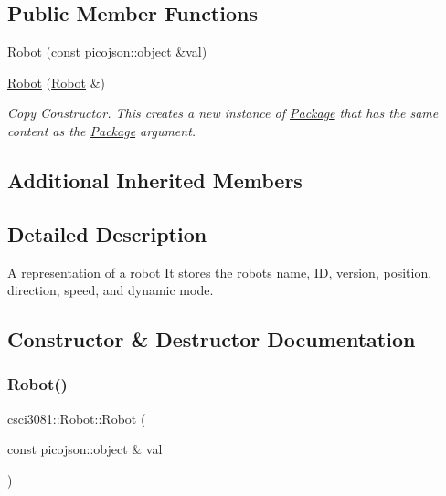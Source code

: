 \subsection*{Public Member Functions}
\begin{DoxyCompactItemize}
\item 
\hyperlink{classcsci3081_1_1Robot_a71e09d18de743a5b677204af60071b4a}{Robot} (const picojson\+::object \&val)
\item 
\hyperlink{classcsci3081_1_1Robot_ae87d6490b70cce02a195794a3bb65b69}{Robot} (\hyperlink{classcsci3081_1_1Robot}{Robot} \&)
\begin{DoxyCompactList}\small\item\em Copy Constructor. This creates a new instance of \hyperlink{classcsci3081_1_1Package}{Package} that has the same content as the \hyperlink{classcsci3081_1_1Package}{Package} argument. \end{DoxyCompactList}\end{DoxyCompactItemize}
\subsection*{Additional Inherited Members}


\subsection{Detailed Description}
A representation of a robot It stores the robot\textquotesingle{}s name, ID, version, position, direction, speed, and dynamic mode. 

\subsection{Constructor \& Destructor Documentation}
\mbox{\label{classcsci3081_1_1Robot_a71e09d18de743a5b677204af60071b4a}} 
\subsubsection{\texorpdfstring{Robot()}{Robot()}\hspace{0.1cm}{\footnotesize\ttfamily [1/2]}}
{\footnotesize\ttfamily csci3081\+::\+Robot\+::\+Robot (\begin{DoxyParamCaption}\item[{const picojson\+::object \&}]{val }\end{DoxyParamCaption})}

